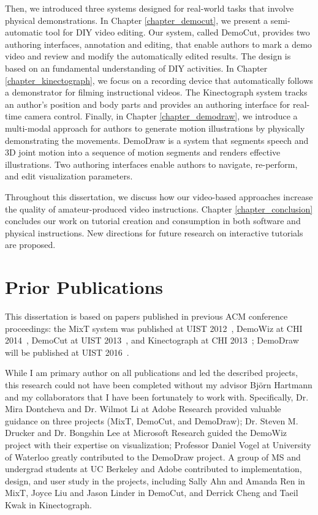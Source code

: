 Then, we introduced three systems designed for real-world tasks that involve physical demonstrations.
In Chapter \ref{chapter_democut}, we present a semi-automatic tool for DIY video editing. Our system, called DemoCut, provides two authoring interfaces, annotation and editing, that enable authors to mark a demo video and review and modify the automatically edited results. The design is based on an fundamental understanding of DIY activities.
In Chapter \ref{chapter_kinectograph}, we focus on a recording device that automatically follows a demonstrator for filming instructional videos. The Kinectograph system tracks an author's position and body parts and provides an authoring interface for real-time camera control.
Finally, in Chapter \ref{chapter_demodraw}, we introduce a multi-modal approach for authors to generate motion illustrations by physically demonstrating the movements. DemoDraw is a system that segments speech and 3D joint motion into a sequence of motion segments and renders effective illustrations. Two authoring interfaces enable authors to navigate, re-perform, and edit visualization parameters.

Throughout this dissertation, we discuss how our video-based approaches increase the quality of amateur-produced video instructions. Chapter \ref{chapter_conclusion} concludes our work on tutorial creation and consumption in both software and physical instructions. New directions for future research on interactive tutorials are proposed.


\section {Prior Publications}

This dissertation is based on papers published in previous ACM conference proceedings: the MixT system was published at UIST 2012~\cite{Chi:2012:MAG:2380116.2380130}, DemoWiz at CHI 2014~\cite{Chi:2014:DRS:2556288.2557254}, DemoCut at UIST 2013~\cite{Chi:2013:DGC:2501988.2502052}, and Kinectograph at CHI 2013~\cite{Cheng:2013:BCC:2468356.2468568}; DemoDraw will be published at UIST 2016~\cite{Chi:2016:DemoDraw}.

While I am primary author on all publications and led the described projects, this research could not have been completed without my advisor Bj\"orn Hartmann and my collaborators that I have been fortunately to work with. Specifically, Dr. Mira Dontcheva and Dr. Wilmot Li at Adobe Research provided valuable guidance on three projects (MixT, DemoCut, and DemoDraw); Dr. Steven M. Drucker and Dr. Bongshin Lee at Microsoft Research guided the DemoWiz project with their expertise on visualization; Professor Daniel Vogel at University of Waterloo greatly contributed to the DemoDraw project. A group of MS and undergrad students at UC Berkeley and Adobe contributed to implementation, design, and user study in the projects, including Sally Ahn and Amanda Ren in MixT, Joyce Liu and Jason Linder in DemoCut, and Derrick Cheng and Taeil Kwak in Kinectograph.

